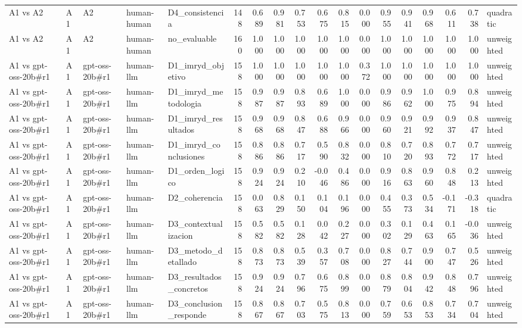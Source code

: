 \begin{table}
{\begin{tabular}{lllllrrrrrrrrrrrrl}
A1 vs A2 & A1 & A2 & human-human & D4\_consistencia & 148 & 0.689 & 0.981 & 0.753 & 0.675 & 0.815 & 0.000 & 0.955 & 0.941 & 0.968 & 0.611 & 0.738 & quadratic \\
A1 vs A2 & A1 & A2 & human-human & no\_evaluable & 160 & 1.000 & 1.000 & 1.000 & 1.000 & 1.000 & 0.000 & 1.000 & 1.000 & 1.000 & 1.000 & 1.000 & unweighted \\
A1 vs gpt-oss-20b\#r1 & A1 & gpt-oss-20b\#r1 & human-llm & D1\_imryd\_objetivo & 158 & 1.000 & 1.000 & 1.000 & 1.000 & 1.000 & 0.372 & 1.000 & 1.000 & 1.000 & 1.000 & 1.000 & unweighted \\
A1 vs gpt-oss-20b\#r1 & A1 & gpt-oss-20b\#r1 & human-llm & D1\_imryd\_metodologia & 158 & 0.987 & 0.987 & 0.893 & 0.689 & 1.000 & 0.000 & 0.986 & 0.962 & 1.000 & 0.975 & 0.894 & unweighted \\
A1 vs gpt-oss-20b\#r1 & A1 & gpt-oss-20b\#r1 & human-llm & D1\_imryd\_resultados & 158 & 0.968 & 0.968 & 0.847 & 0.688 & 0.966 & 0.000 & 0.960 & 0.921 & 0.992 & 0.937 & 0.847 & unweighted \\
A1 vs gpt-oss-20b\#r1 & A1 & gpt-oss-20b\#r1 & human-llm & D1\_imryd\_conclusiones & 158 & 0.886 & 0.886 & 0.717 & 0.590 & 0.832 & 0.000 & 0.810 & 0.720 & 0.893 & 0.772 & 0.717 & unweighted \\
A1 vs gpt-oss-20b\#r1 & A1 & gpt-oss-20b\#r1 & human-llm & D1\_orden\_logico & 158 & 0.924 & 0.924 & 0.210 & -0.046 & 0.486 & 0.000 & 0.916 & 0.863 & 0.960 & 0.848 & 0.213 & unweighted \\
A1 vs gpt-oss-20b\#r1 & A1 & gpt-oss-20b\#r1 & human-llm & D2\_coherencia & 158 & 0.063 & 0.829 & 0.150 & 0.104 & 0.196 & 0.000 & 0.455 & 0.373 & 0.534 & -0.171 & -0.318 & quadratic \\
A1 vs gpt-oss-20b\#r1 & A1 & gpt-oss-20b\#r1 & human-llm & D3\_contextualizacion & 158 & 0.582 & 0.582 & 0.128 & 0.042 & 0.227 & 0.000 & 0.302 & 0.129 & 0.463 & 0.165 & -0.036 & unweighted \\
A1 vs gpt-oss-20b\#r1 & A1 & gpt-oss-20b\#r1 & human-llm & D3\_metodo\_detallado & 158 & 0.873 & 0.873 & 0.539 & 0.357 & 0.708 & 0.000 & 0.827 & 0.744 & 0.900 & 0.747 & 0.526 & unweighted \\
A1 vs gpt-oss-20b\#r1 & A1 & gpt-oss-20b\#r1 & human-llm & D3\_resultados\_concretos & 158 & 0.924 & 0.924 & 0.796 & 0.675 & 0.899 & 0.000 & 0.879 & 0.804 & 0.942 & 0.848 & 0.796 & unweighted \\
A1 vs gpt-oss-20b\#r1 & A1 & gpt-oss-20b\#r1 & human-llm & D3\_conclusion\_responde & 158 & 0.867 & 0.867 & 0.703 & 0.575 & 0.813 & 0.000 & 0.759 & 0.653 & 0.853 & 0.734 & 0.704 & unweighted \\

\end{tabular}}
\end{table}
